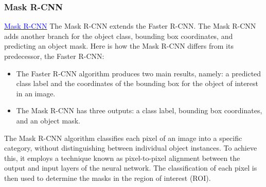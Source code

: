 \subsubsection{Mask R-CNN}
\textcolor{red}{\href{https://arxiv.org/pdf/1703.06870.pdf}{\textcolor{blue}{Mask R-CNN}}}
The Mask R-CNN extends the Faster R-CNN. The Mask R-CNN adds another branch for the object class, bounding box coordinates, and predicting an object mask.
Here is how the Mask R-CNN differs from its predecessor, the Faster R-CNN:
\begin{itemize}
    \item The Faster R-CNN algorithm produces two main results, namely: a predicted class label and the coordinates of the bounding box for the object of interest in an image.
    \item The Mask R-CNN has three outputs: a class label, bounding box coordinates, and an object mask.
\end{itemize}
The Mask R-CNN algorithm classifies each pixel of an image into a specific category, without distinguishing between individual object instances. To achieve this, it employs a technique known as pixel-to-pixel alignment between the output and input layers of the neural network. The classification of each pixel is then used to determine the masks in the region of interest (ROI).


